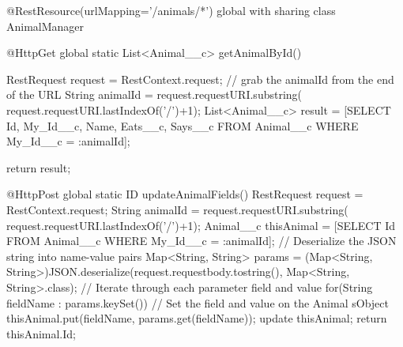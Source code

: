 @RestResource(urlMapping='/animals/*')
global with sharing class AnimalManager {
    @HttpGet
    global static List<Animal__c> getAnimalById() {
        RestRequest request = RestContext.request;
        // grab the animalId from the end of the URL
        String animalId = request.requestURI.substring(
          request.requestURI.lastIndexOf('/')+1);
        List<Animal__c> result =  [SELECT Id, My_Id__c, Name, Eats__c, Says__c
                        FROM Animal__c
                        WHERE My_Id__c = :animalId];
        
        return result;
    }

    @HttpPost
    global static ID updateAnimalFields() {
        RestRequest request = RestContext.request;
        String animalId = request.requestURI.substring(
            request.requestURI.lastIndexOf('/')+1);
            Animal__c thisAnimal = [SELECT Id FROM Animal__c WHERE My_Id__c = :animalId];
        // Deserialize the JSON string into name-value pairs
        Map<String, String> params = (Map<String, String>)JSON.deserialize(request.requestbody.tostring(),  Map<String, String>.class);
        // Iterate through each parameter field and value
        for(String fieldName : params.keySet()) {
            // Set the field and value on the Animal sObject
            thisAnimal.put(fieldName, params.get(fieldName));
        }
        update thisAnimal;
        return thisAnimal.Id;
    }      
}